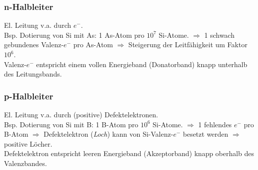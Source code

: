\subsubsection{n-Halbleiter}
El. Leitung v.a. durch $e^-$. \\
Bsp. Dotierung von Si mit As: 1 As-Atom pro $10^7$ Si-Atome. $\Rightarrow$ 1 schwach gebundenes Valenz-$e^-$ pro As-Atom $\Rightarrow$ Steigerung der Leitfähigkeit um Faktor $10^6$. \\
Valenz-$e^-$ entspricht einem vollen Energieband (Donatorband) knapp unterhalb des Leitungsbands. 

\subsubsection{p-Halbleiter}
El. Leitung v.a. durch (positive) Defektelektronen. \\
Bsp. Dotierung von Si mit B: 1 B-Atom pro $10^6$ Si-Atome. $\Rightarrow$ 1 fehlendes $e^-$ pro B-Atom $\Rightarrow$ Defektelektron (\emph{Loch}) kann von Si-Valenz-$e^-$ besetzt werden $\Rightarrow$ positive Löcher. \\
Defektelektron entspricht leeren Energieband (Akzeptorband) knapp oberhalb des Valenzbandes.